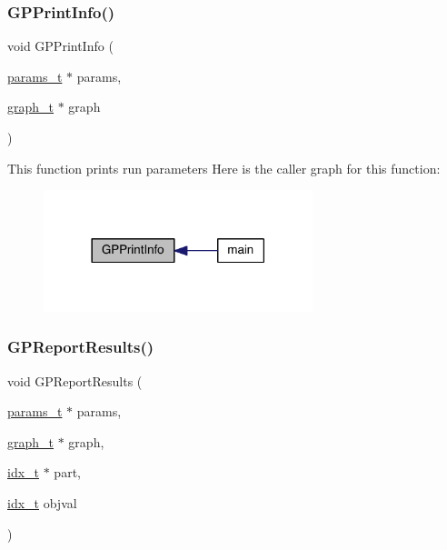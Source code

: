 \subsubsection{\texorpdfstring{G\+P\+Print\+Info()}{GPPrintInfo()}}
{\footnotesize\ttfamily void G\+P\+Print\+Info (\begin{DoxyParamCaption}\item[{\hyperlink{a00706}{params\+\_\+t} $\ast$}]{params,  }\item[{\hyperlink{a00734}{graph\+\_\+t} $\ast$}]{graph }\end{DoxyParamCaption})}

This function prints run parameters Here is the caller graph for this function\+:\nopagebreak
\begin{figure}[H]
\begin{center}
\leavevmode
\includegraphics[width=222pt]{a00311_a621f3f8c2f9b93614ecb2fdf86a6cc53_icgraph}
\end{center}
\end{figure}
\mbox{\label{a00311_af57a862e6ce57a691244341103615ed2}} 
\subsubsection{\texorpdfstring{G\+P\+Report\+Results()}{GPReportResults()}}
{\footnotesize\ttfamily void G\+P\+Report\+Results (\begin{DoxyParamCaption}\item[{\hyperlink{a00706}{params\+\_\+t} $\ast$}]{params,  }\item[{\hyperlink{a00734}{graph\+\_\+t} $\ast$}]{graph,  }\item[{\hyperlink{a00876_aaa5262be3e700770163401acb0150f52}{idx\+\_\+t} $\ast$}]{part,  }\item[{\hyperlink{a00876_aaa5262be3e700770163401acb0150f52}{idx\+\_\+t}}]{objval }\end{DoxyParamCaption})}

